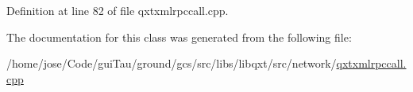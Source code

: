 Definition at line 82 of file qxtxmlrpccall.\-cpp.



The documentation for this class was generated from the following file\-:\begin{DoxyCompactItemize}
\item 
/home/jose/\-Code/gui\-Tau/ground/gcs/src/libs/libqxt/src/network/\hyperlink{qxtxmlrpccall_8cpp}{qxtxmlrpccall.\-cpp}\end{DoxyCompactItemize}
